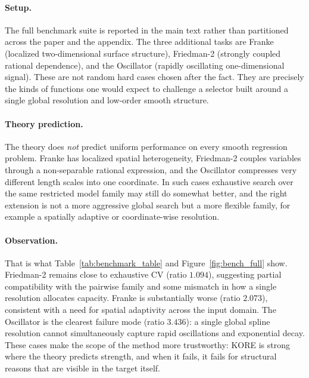\documentclass{article}
\newcommand{\KORE}{\textsc{KORE}}
\begin{document}
\paragraph{Setup.}
The full benchmark suite is reported in the main text rather than partitioned across the paper and the appendix. The three additional tasks are Franke (localized two-dimensional surface structure), Friedman-2 (strongly coupled rational dependence), and the Oscillator (rapidly oscillating one-dimensional signal). These are not random hard cases chosen after the fact. They are precisely the kinds of functions one would expect to challenge a selector built around a single global resolution and low-order smooth structure.

\paragraph{Theory prediction.}
The theory does \emph{not} predict uniform performance on every smooth regression problem. Franke has localized spatial heterogeneity, Friedman-2 couples variables through a non-separable rational expression, and the Oscillator compresses very different length scales into one coordinate. In such cases exhaustive search over the same restricted model family may still do somewhat better, and the right extension is not a more aggressive global search but a more flexible family, for example a spatially adaptive or coordinate-wise resolution.

\paragraph{Observation.}
That is what Table~\ref{tab:benchmark_table} and Figure~\ref{fig:bench_full} show. Friedman-2 remains close to exhaustive CV (ratio $1.094$), suggesting partial compatibility with the pairwise family and some mismatch in how a single resolution allocates capacity. Franke is substantially worse (ratio $2.073$), consistent with a need for spatial adaptivity across the input domain. The Oscillator is the clearest failure mode (ratio $3.436$): a single global spline resolution cannot simultaneously capture rapid oscillations and exponential decay. These cases make the scope of the method more trustworthy: \KORE{} is strong where the theory predicts strength, and when it fails, it fails for structural reasons that are visible in the target itself.
\end{document}
